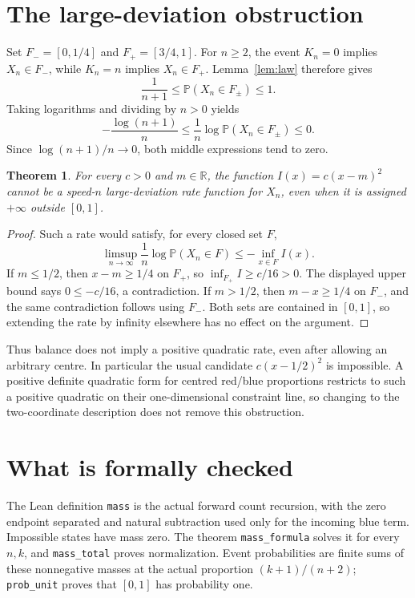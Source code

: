 \documentclass[11pt]{article}
\newtheorem{theorem}{Theorem}
\begin{document}
\newpage
\section*{The large-deviation obstruction}
Set $F_-=[0,1/4]$ and $F_+=[3/4,1]$. For $n\geq2$,
the event $K_n=0$ implies $X_n\in F_-$, while $K_n=n$
implies $X_n\in F_+$. Lemma~\ref{lem:law} therefore gives
\[
 \frac{1}{n+1}\leq\mathbb P(X_n\in F_\pm)\leq1.
\]
Taking logarithms and dividing by $n>0$ yields
\[
 -\frac{\log(n+1)}{n}
 \leq\frac1n\log\mathbb P(X_n\in F_\pm)\leq0.
\]
Since $\log(n+1)/n\to0$, both middle expressions tend to zero.

\begin{theorem}
For every $c>0$ and $m\in\mathbb R$, the function
$I(x)=c(x-m)^2$ cannot be a speed-$n$ large-deviation rate
function for $X_n$, even when it is assigned $+\infty$ outside
$[0,1]$.
\end{theorem}
\begin{proof}
Such a rate would satisfy, for every closed set $F$,
\[
 \limsup_{n\to\infty}\frac1n\log\mathbb P(X_n\in F)
 \leq-\inf_{x\in F}I(x).
\]
If $m\leq1/2$, then $x-m\geq1/4$ on $F_+$, so
$\inf_{F_+}I\geq c/16>0$. The displayed upper bound says
$0\leq-c/16$, a contradiction. If $m>1/2$, then
$m-x\geq1/4$ on $F_-$, and the same contradiction follows
using $F_-$. Both sets are contained in $[0,1]$, so extending
the rate by infinity elsewhere has no effect on the argument.
\end{proof}

Thus balance does not imply a positive quadratic rate, even
after allowing an arbitrary centre. In particular the usual
candidate $c(x-1/2)^2$ is impossible. A positive definite
quadratic form for centred red/blue proportions restricts to
such a positive quadratic on their one-dimensional constraint
line, so changing to the two-coordinate description does not
remove this obstruction.

\section*{What is formally checked}
The Lean definition \texttt{mass} is the actual forward count
recursion, with the zero endpoint separated and natural
subtraction used only for the incoming blue term. Impossible
states have mass zero. The theorem \texttt{mass\_formula}
solves it for every $n,k$, and \texttt{mass\_total} proves
normalization. Event probabilities are finite sums of these
nonnegative masses at the actual proportion $(k+1)/(n+2)$;
\texttt{prob\_unit} proves that $[0,1]$ has probability one.
\end{document}

